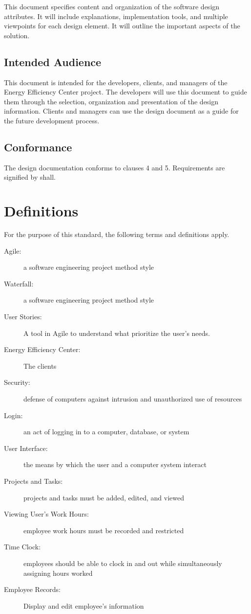 \documentclass[letterpaper,10pt,titlepage,journal,compsoc,draftclsnofoot,onecolumn]{IEEEtran}
\begin{document}
This document specifies content and organization of  the software design attributes. It will include explanations, implementation tools, and multiple viewpoints for each design element. It will outline the important aspects of the solution. 

\subsection{Intended Audience}

This document is intended for the developers,  clients, and managers of the Energy Efficiency Center project. The developers will use this document to guide them through the selection, organization and presentation of the design information. Clients and managers can use the design document as a guide for the future development process.

\subsection{Conformance}

The design documentation conforms to clauses 4 and 5. Requirements are signified by shall. 

\section{Definitions}

For the purpose of this standard, the following terms and definitions apply.

\begin{description}
\item[Agile: ] a software engineering project method style
\item[Waterfall: ] a software engineering project method style
\item[User Stories: ] A tool in Agile to understand what prioritize the user's needs.
\item[Energy Efficiency Center: ] The clients
\item[Security:] defense of computers against intrusion and unauthorized use of resources
\item[Login:] an act of logging in to a computer, database, or system
\item[User Interface:] the means by which the user and a computer system interact
\item[Projects and Tasks:] projects and tasks must be added, edited, and viewed
\item[Viewing User's Work Hours:] employee work hours must be recorded and restricted 
\item[Time Clock: ] employees should be able to clock in and out while simultaneously assigning hours worked
\item[Employee Records:] Display and edit employee's information
\end{description}
\end{document}

